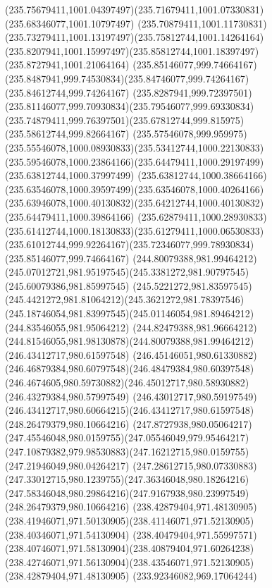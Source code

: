 {{  \curveto(235.75679411,1001.04397497)(235.71679411,1001.07330831)(235.68346077,1001.10797497)
  \curveto(235.70879411,1001.11730831)(235.73279411,1001.13197497)(235.75812744,1001.14264164)
  \curveto(235.8207941,1001.15997497)(235.85812744,1001.18397497)(235.8727941,1001.21064164)
  \moveto(235.85146077,999.74664167)
  \curveto(235.8487941,999.74530834)(235.84746077,999.74264167)(235.84612744,999.74264167)
  \curveto(235.8287941,999.72397501)(235.81146077,999.70930834)(235.79546077,999.69330834)
  \curveto(235.74879411,999.76397501)(235.67812744,999.815975)(235.58612744,999.82664167)
  \curveto(235.57546078,999.959975)(235.55546078,1000.08930833)(235.53412744,1000.22130833)
  \curveto(235.59546078,1000.23864166)(235.64479411,1000.29197499)(235.63812744,1000.37997499)
  \curveto(235.63812744,1000.38664166)(235.63546078,1000.39597499)(235.63546078,1000.40264166)
  \curveto(235.63946078,1000.40130832)(235.64212744,1000.40130832)(235.64479411,1000.39864166)
  \curveto(235.62879411,1000.28930833)(235.61412744,1000.18130833)(235.61279411,1000.06530833)
  \curveto(235.61012744,999.92264167)(235.72346077,999.78930834)(235.85146077,999.74664167)
  \moveto(244.80079388,981.99464212)
  \curveto(245.07012721,981.95197545)(245.3381272,981.90797545)(245.60079386,981.85997545)
  \curveto(245.5221272,981.83597545)(245.4421272,981.81064212)(245.3621272,981.78397546)
  \curveto(245.18746054,981.83997545)(245.01146054,981.89464212)(244.83546055,981.95064212)
  \curveto(244.82479388,981.96664212)(244.81546055,981.98130878)(244.80079388,981.99464212)
  \moveto(246.43412717,980.61597548)
  \curveto(246.45146051,980.61330882)(246.46879384,980.60797548)(246.48479384,980.60397548)
  \curveto(246.4674605,980.59730882)(246.45012717,980.58930882)(246.43279384,980.57997549)
  \curveto(246.43012717,980.59197549)(246.43412717,980.60664215)(246.43412717,980.61597548)
  \moveto(248.26479379,980.10664216)
  \curveto(247.8727938,980.05064217)(247.45546048,980.0159755)(247.05546049,979.95464217)
  \curveto(247.10879382,979.98530883)(247.16212715,980.0159755)(247.21946049,980.04264217)
  \curveto(247.28612715,980.07330883)(247.33012715,980.1239755)(247.36346048,980.18264216)
  \curveto(247.58346048,980.29864216)(247.9167938,980.23997549)(248.26479379,980.10664216)
  \moveto(238.42879404,971.48130905)
  \curveto(238.41946071,971.50130905)(238.41146071,971.52130905)(238.40346071,971.54130904)
  \curveto(238.40479404,971.55997571)(238.40746071,971.58130904)(238.40879404,971.60264238)
  \curveto(238.42746071,971.56130904)(238.43546071,971.52130905)(238.42879404,971.48130905)
  \moveto(233.92346082,969.17064244)
}}
